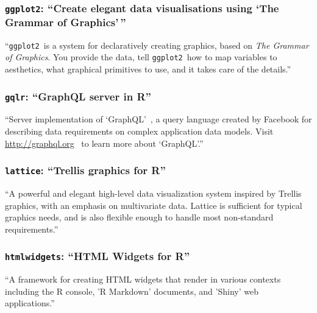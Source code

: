 \documentclass[stat,dissertation]{puthesis}\usepackage[]{graphicx}\usepackage{xcolor}
\newcommand{\pkg}[1]{\texttt{#1}}
\newcommand{\ggplot}{\pkg{ggplot2}}
\newcommand{\gqlr}{\pkg{gqlr}}
\begin{document}
\subsubsection{\ggplot: ``Create elegant data visualisations using `The Grammar of Graphics'\,''}
  ``\ggplot~is a system for declaratively creating graphics, based on \emph{The Grammar of Graphics}. You provide the data, tell \ggplot~how to map variables to aesthetics, what graphical primitives to use, and it takes care of the details.''~\cite{github_ggplot2}~\cite{r_ggplot2}


\subsubsection{\gqlr: ``GraphQL server in R''}

``Server implementation of `GraphQL'~\cite{graphql_spec}, a query language created by Facebook for describing data requirements on complex application data models.  Visit \url{http://graphql.org}~\cite{graphql_org} to learn more about `GraphQL'.''~\cite{r_gqlr}~\cite{github_gqlr}


\subsubsection{\pkg{lattice}: ``Trellis graphics for R''}

``A powerful and elegant high-level data visualization system inspired by Trellis graphics, with an emphasis on multivariate data. Lattice is sufficient for typical graphics needs, and is also flexible enough to handle most non-standard requirements.''~\cite{r_lattice}



\subsubsection{\pkg{htmlwidgets}: ``HTML Widgets for R''}

``A framework for creating HTML widgets that render in various contexts including the R console, 'R Markdown' documents, and 'Shiny' web applications.''~\cite{r_htmlwidgets}~\cite{github_htmlwidgets}
\end{document}
